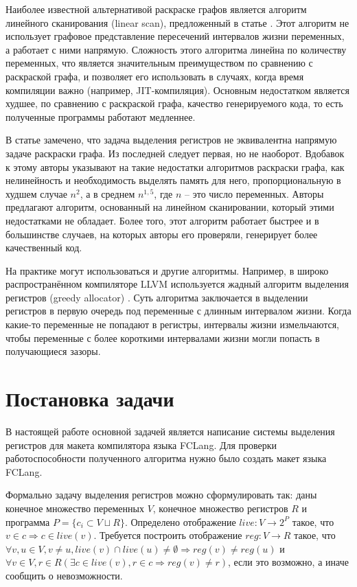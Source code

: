 \documentclass[a4paper,14pt]{extarticle}
\begin{document}
Наиболее известной альтернативой раскраске графов является алгоритм линейного сканирования (linear scan), предложенный в статье \cite{poletto_linear_1999}.
Этот алгоритм не использует графовое представление пересечений интервалов жизни переменных, а работает с ними напрямую.
Сложность этого алгоритма линейна по количеству переменных, что является значительным преимуществом по сравнению с раскраской графа,
и позволяет его использовать в случаях, когда время компиляции важно (например, JIT-компиляция).
Основным недостатком является худшее, по сравнению с раскраской графа, качество генерируемого кода, то есть полученные программы работают медленнее.

В статье \cite{krishnamurthi_extended_2007} замечено, что задача выделения регистров не эквивалентна напрямую задаче раскраски графа.
Из последней следует первая, но не наоборот.
Вдобавок к этому авторы указывают на такие недостатки алгоритмов раскраски графа,
как нелинейность и необходимость выделять память для него,
пропорциональную в худшем случае $n^2$, а в среднем $n^{1,5}$, где $n$ -- это число переменных.
Авторы предлагают алгоритм, основанный на линейном сканировании, который этими недостатками не обладает.
Более того, этот алгоритм работает быстрее и в большинстве случаев, на которых авторы его проверяли, генерирует более качественный код.

На практике могут использоваться и другие алгоритмы.
Например, в широко распространённом компиляторе LLVM используется жадный алгоритм выделения регистров (greedy allocator) \cite{llvm_greedy_2011}.
Суть алгоритма заключается в выделении регистров в первую очередь под переменные с длинным интервалом жизни.
Когда какие-то переменные не попадают в регистры, интервалы жизни измельчаются, чтобы переменные с более короткими интервалами жизни могли попасть в получающиеся зазоры.


\section{Постановка задачи}

В настоящей работе основной задачей является написание системы выделения регистров для макета компилятора языка FCLang.
Для проверки работоспособности полученного алгоритма нужно было создать макет языка FCLang.

Формально задачу выделения регистров можно сформулировать так: даны конечное множество переменных $V$,
конечное множество регистров $R$ и программа $P = \{ c_i \subset V \sqcup R \}$.
Определено отображение $live : V \rightarrow 2^P$ такое, что $v \in c \Rightarrow c \in live(v)$.
Требуется построить отображение $reg : V \rightarrow R$ такое, что $\forall v, u \in V, v \neq u, live(v) \cap live(u) \neq \emptyset \Rightarrow reg(v) \neq reg(u)$
и $\forall v \in V, r \in R \left(\exists c \in live(v), r \in c \Rightarrow reg(v) \neq r \right)$, если это возможно, а иначе сообщить о невозможности.
\end{document}
